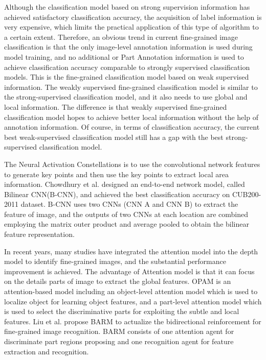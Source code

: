 \documentclass[10pt,twocolumn,letterpaper]{article}
\begin{document}
Although the classification model based on strong supervision information has achieved satisfactory classification accuracy, the acquisition of label information is very expensive, which limits the practical application of this type of algorithm to a certain extent. Therefore, an obvious trend in current fine-grained image classification is that the only image-level annotation information is used during model training, and no additional or Part Annotation information is used to achieve classification accuracy comparable to strongly supervised classification models. This is the fine-grained classification model based on weak supervised information. The weakly supervised fine-grained classification model is similar to the strong-supervised classification model, and it also needs to use global and local information. The difference is that weakly supervised fine-grained classification model hopes to achieve better local information without the help of annotation information. Of course, in terms of classification accuracy, the current best weak-supervised classification model still has a gap with the best strong-supervised classification model.

The Neural Activation Constellations\cite{7410493} is to use the convolutional network features to generate key points and then use the key points to extract local area information. Chowdhury et al.\cite{2015Bilinear} designed an end-to-end network model, called Bilinear CNN(B-CNN), and achieved the best classification accuracy on CUB200-2011 dataset. B-CNN uses two CNNs (CNN A and CNN B) to extract the feature of image, and the outputs of two CNNs at each location are combined employing the matrix outer product and average pooled to obtain the bilinear feature representation.

In recent years, many studies have integrated the attention model into the depth model to identify fine-grained images, and the substantial performance improvement is achieved. The advantage of Attention model is that it can focus on the details parts of image to extract the global features. OPAM\cite{Peng2017Object} is an attention-based model including an object-level attention model which is used to localize object for learning object features, and a part-level attention model which is used to select the discriminative parts for exploiting the subtle and local features. Liu et al.\cite{Liu2020Bidirectional} propose BARM to actualize the bidirectional reinforcement for fine-grained image recognition. BARM consists of one attention agent for discriminate part regions proposing and one recognition agent for feature extraction and recognition.
\end{document}
